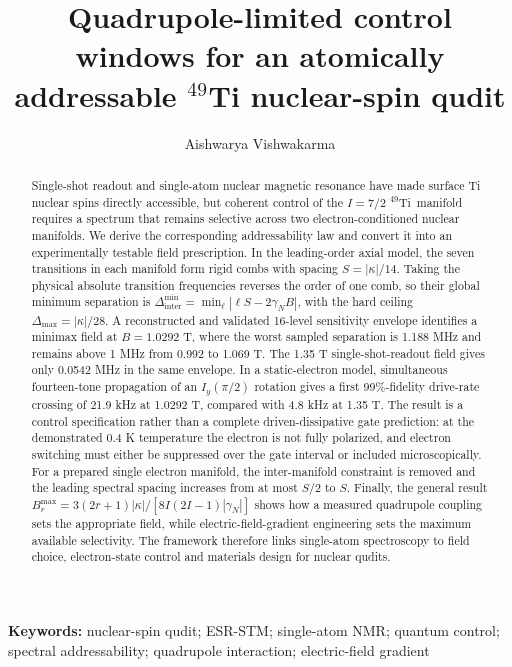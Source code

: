 \documentclass[11pt]{article}
\title{Quadrupole-limited control windows for an atomically addressable $^{49}$Ti nuclear-spin qudit}
\author{Aishwarya Vishwakarma}
\affil{Department of Quantum Matter Physics, University of Geneva, 1211 Geneva, Switzerland}
\affil{Corresponding author: \href{mailto:Aishwarya.Vishwakarma@unige.ch}{Aishwarya.Vishwakarma@unige.ch}}
\date{}
\newcommand{\Ti}{$^{49}$Ti}
\newcommand{\DeltaInter}{\Delta_{\mathrm{inter}}^{\min}}
\begin{document}
\maketitle

\begin{abstract}
Single-shot readout and single-atom nuclear magnetic resonance have made surface Ti nuclear spins directly accessible, but coherent control of the $I=7/2$ \Ti\ manifold requires a spectrum that remains selective across two electron-conditioned nuclear manifolds. We derive the corresponding addressability law and convert it into an experimentally testable field prescription. In the leading-order axial model, the seven transitions in each manifold form rigid combs with spacing $S=|\kappa|/14$. Taking the physical absolute transition frequencies reverses the order of one comb, so their global minimum separation is $\DeltaInter=\min_\ell|\ell S-2\gamma_NB|$, with the hard ceiling $\Delta_{\max}=|\kappa|/28$. A reconstructed and validated 16-level sensitivity envelope identifies a minimax field at $B=1.0292$ T, where the worst sampled separation is 1.188 MHz and remains above 1 MHz from 0.992 to 1.069 T. The 1.35 T single-shot-readout field gives only 0.0542 MHz in the same envelope. In a static-electron model, simultaneous fourteen-tone propagation of an $I_y(\pi/2)$ rotation gives a first 99\%-fidelity drive-rate crossing of 21.9 kHz at 1.0292 T, compared with 4.8 kHz at 1.35 T. The result is a control specification rather than a complete driven-dissipative gate prediction: at the demonstrated 0.4 K temperature the electron is not fully polarized, and electron switching must either be suppressed over the gate interval or included microscopically. For a prepared single electron manifold, the inter-manifold constraint is removed and the leading spectral spacing increases from at most $S/2$ to $S$. Finally, the general result $B_r^{\max}=3(2r+1)|\kappa|/[8I(2I-1)|\gamma_N|]$ shows how a measured quadrupole coupling sets the appropriate field, while electric-field-gradient engineering sets the maximum available selectivity. The framework therefore links single-atom spectroscopy to field choice, electron-state control and materials design for nuclear qudits.
\end{abstract}

\noindent\textbf{Keywords:} nuclear-spin qudit; ESR-STM; single-atom NMR; quantum control; spectral addressability; quadrupole interaction; electric-field gradient
\end{document}
